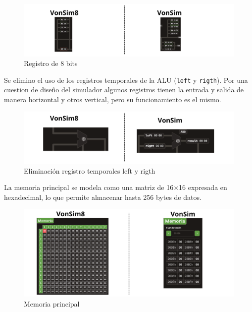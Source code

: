 \documentclass[12pt,oneside]{templates/unerthesis}
\begin{document}
\begin{figure}

{\centering \includegraphics[width=0.85\linewidth]{images/registros} 

}

\caption{Registro de 8 bits}\label{fig:registros}
\end{figure}

Se elimino el uso de los registros temporales de la ALU (\texttt{left} y \texttt{rigth}).
Por una cuestion de diseño del simulador algunos registros tienen la entrada y salida de manera horizontal y otros vertical, pero su funcionamiento es el mismo.

\begin{figure}

{\centering \includegraphics[width=0.85\linewidth]{images/leftrigth} 

}

\caption{Eliminación registro temporales left y rigth}\label{fig:leftrigth}
\end{figure}

La memoria principal se modela como una matriz de 16×16 expresada en hexadecimal, lo que permite almacenar hasta 256 bytes de datos.

\begin{figure}

{\centering \includegraphics[width=0.85\linewidth]{images/memoriacomp} 

}

\caption{Memoria principal}\label{fig:memoriacomp}
\end{figure}
\end{document}
